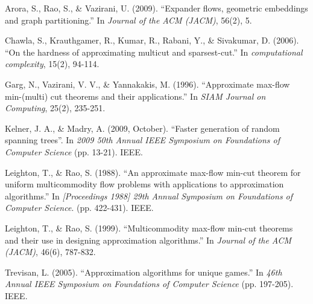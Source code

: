 \documentclass{article}
\begin{document}

















\begin{thebibliography}{99}
Arora, S., Rao, S., \& Vazirani, U. (2009). ``Expander flows, geometric embeddings and graph partitioning.'' In \emph{Journal of the ACM (JACM)}, 56(2), 5.

Chawla, S., Krauthgamer, R., Kumar, R., Rabani, Y., \& Sivakumar, D. (2006). ``On the hardness of approximating multicut and sparsest-cut.'' In \emph{computational complexity}, 15(2), 94-114.

Garg, N., Vazirani, V. V., \& Yannakakis, M. (1996). ``Approximate max-flow min-(multi) cut theorems and their applications.'' In \emph{SIAM Journal on Computing}, 25(2), 235-251.

Kelner, J. A., \& Madry, A. (2009, October). ``Faster generation of random spanning trees''. In \emph{2009 50th Annual IEEE Symposium on Foundations of Computer Science} (pp. 13-21). IEEE.

Leighton, T., \& Rao, S. (1988). ``An approximate max-flow min-cut theorem for uniform multicommodity flow problems with applications to approximation algorithms.'' In \emph{[Proceedings 1988] 29th Annual Symposium on Foundations of Computer Science}. (pp. 422-431). IEEE.

Leighton, T., \& Rao, S. (1999). ``Multicommodity max-flow min-cut theorems and their use in designing approximation algorithms.'' In \emph{Journal of the ACM (JACM)}, 46(6), 787-832.

Trevisan, L. (2005). ``Approximation algorithms for unique games.'' In \emph{46th Annual IEEE Symposium on Foundations of Computer Science} (pp. 197-205). IEEE.
\end{thebibliography}
\end{document}
